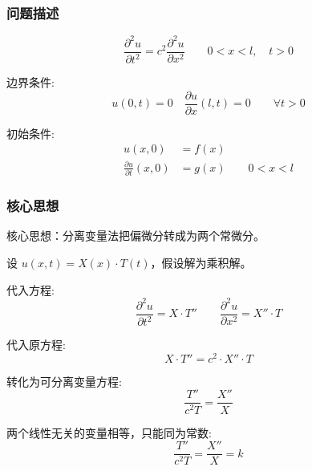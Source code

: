 \documentclass[12pt,a4paper]{article}
\numberwithin{subsection}{section}
\numberwithin{subsubsection}{subsection}
\theoremstyle{plain}
\theoremstyle{definition}
\theoremstyle{remark}
\begin{document}
	\subsubsection{问题描述}
	\begin{equation} \label{eq:wave_equation_mixed1}
		\frac{\partial^2 u}{\partial t^2} = c^2 \frac{\partial^2 u}{\partial x^2} \qquad 0 < x < l, \quad t > 0
	\end{equation}
	
	边界条件:
	\begin{equation} \label{eq:boundary_conditions_mixed1}
		u(0, t) = 0 \quad \frac{\partial u}{\partial x}(l, t) = 0 \qquad \forall t > 0
	\end{equation}
	
	初始条件:
	\begin{equation} \label{eq:initial_conditions_mixed1}
		\begin{aligned}
			u(x, 0) &= f(x) \\
			\frac{\partial u}{\partial t}(x, 0) &= g(x) \qquad 0 < x < l
		\end{aligned}
	\end{equation}
	
	\subsubsection{核心思想}
	核心思想：分离变量法把偏微分转成为两个常微分。
	
	设 \(u(x, t) = X(x) \cdot T(t)\)，假设解为乘积解。
	
	代入方程:
	\begin{equation} \label{eq:substitution_mixed1}
		\frac{\partial^2 u}{\partial t^2} = X \cdot T'' \qquad \frac{\partial^2 u}{\partial x^2} = X'' \cdot T
	\end{equation}
	
	代入原方程:
	\begin{equation} \label{eq:original_substitution_mixed1}
		X \cdot T'' = c^2 \cdot X'' \cdot T
	\end{equation}
	
	转化为可分离变量方程:
	\begin{equation} \label{eq:separation_mixed1}
		\frac{T''}{c^2 T} = \frac{X''}{X}
	\end{equation}
	
	两个线性无关的变量相等，只能同为常数:
	\begin{equation} \label{eq:constant_mixed1}
		\frac{T''}{c^2 T} = \frac{X''}{X} = k
	\end{equation}
	
\end{document}
